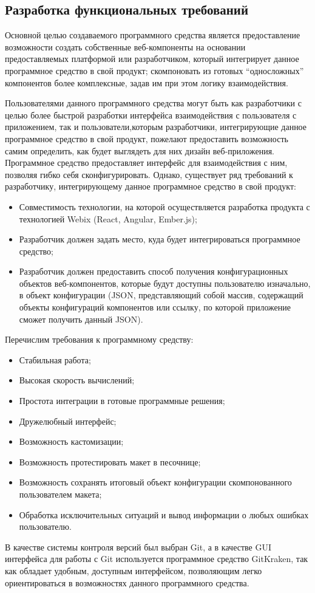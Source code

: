 \subsection{Разработка функциональных требований}
\label{sec:modeling:specification}

Основной целью создаваемого программного средства является предоставление возможности создать собственные веб-компоненты на основании предоставляемых платформой или разработчиком, который интегрирует данное программное средство в свой продукт; скомпоновать из готовых “односложных” компонентов более комплексные, задав им при этом логику взаимодействия.
 
Пользователями данного программного средства могут быть как разработчики с целью более быстрой разработки интерфейса взаимодействия с пользователя с приложением, так и пользователи,которым разработчики, интегрирующие данное программное средство в свой продукт, пожелают предоставить возможность самим определить, как будет выглядеть для них дизайн веб-приложения.
Программное средство предоставляет интерфейс для взаимодействия с ним, позволяя гибко себя сконфигурировать. Однако, существует ряд требований к разработчику, интегрирующему данное программное средство в свой продукт:

\begin{itemize}
    \item Совместимость технологии, на которой осуществляется разработка продукта с технологией Webix (React, Angular, Ember.js);
    \item Разработчик должен задать место, куда будет интегрироваться программное средство;
    \item Разработчик должен предоставить способ получения конфигурационных объектов веб-компонентов, которые будут доступны пользователю изначально, в объект конфигурации (JSON, представляющий собой массив, содержащий объекты конфигураций компонентов или ссылку, по которой приложение сможет получить данный JSON).
\end{itemize}

Перечислим требования к программному средству:

\begin{itemize}
    \item Стабильная работа;
    \item Высокая скорость вычислений;
    \item Простота интеграции в готовые программные решения;
    \item Дружелюбный интерфейс;
    \item Возможность кастомизации;
    \item Возможность протестировать макет в песочнице;
    \item Возможность сохранять итоговый объект конфигурации скомпонованного пользователем макета;
    \item Обработка исключительных ситуаций и вывод информации о любых ошибках пользователю.
\end{itemize}

В качестве системы контроля версий был выбран Git, а в качестве GUI интерфейса для работы с Git используется программное средство GitKraken, так как обладает удобным, доступным интерфейсом, позволяющим легко ориентироваться в возможностях данного программного средства.
